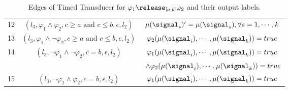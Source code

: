 \begin{table}[H]
{\begin{tabular}{@{}ccc@{}}
        12 & $(l_3, \varphi_1 \land \varphi_2,  c \geq a \text{ and } c \leq b, \epsilon, l_2)$ & $\mu(\signal_s)'=\mu(\signal_s), \forall s= 1, \cdots, k$ \\
        13 & $(l_3, \varphi_1 \land \neg \varphi_2,  c \geq a \text{ and } c \leq b, \epsilon, l_2)$ & $\varphi_2(\mu(\signal_i), \cdots, \mu(\signal_k))=true$  \\
        14 & $(l_3,  \neg \varphi_1 \land  \neg \varphi_2,  c =b, \epsilon, l_2)$ & $\varphi_1(\mu(\signal_i), \cdots, \mu(\signal_k))=true $  \\
        & & $~\land \varphi_2(\mu(\signal_i), \cdots, \mu(\signal_k))=true$\\
        15 & $(l_3, \neg \varphi_1 \land \varphi_2,  c=b, \epsilon, l_2)$ & $\varphi_1(\mu(\signal_i), \cdots, \mu(\signal_k))=true$  \\
        
        
        \bottomrule
        \end{tabular}}
        \caption
        {Edges of Timed Transducer for $\varphi_1\release_{[a,b]}\varphi_2$ and their output labels.}
        \label{table:release}
        \end{table}




